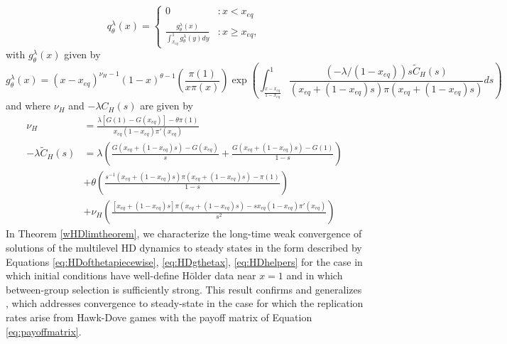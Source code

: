 \documentclass[11pt]{article}
\numberwithin{equation}{section}
\newcommand{\ds}{\displaystyle}
\begin{document}
{ \begin{equation} \label{eq:HDofthetapiecewise}
   q^{\lambda}_{\theta}(x) = \left\{
     \begin{array}{lr}
       0 & : x < x_{eq}\\
       \ds\frac{g^{\lambda}_{\theta}(x)}{\int_{x_{eq}}^{1} g^{\lambda}_{\theta}(y) dy}  & : x \geq x_{eq},
     \end{array}
   \right.
\end{equation} 
with  $g^{\lambda}_{\theta}(x)$ given by
\begin{equation} \label{eq:HDgthetax}
    g^{\lambda}_{\theta}(x) = \left(x - x_{eq}\right)^{\nu_H - 1} \left(1 - x\right)^{\theta - 1} \left( \frac{\pi(1)}{x \pi(x)} \right) \exp\left(\int_{\frac{x-x_{eq}}{1 - x_{eq}}}^1 \frac{\left(-\lambda / (1-x_{eq}) \right) s \tilde{C}_H(s) }{(x_{eq} + (1 - x_{eq}) s) \pi(x_{eq} + (1-x_{eq}) s)} ds \right)
\end{equation}
and where $\nu_H$ and $-\lambda C_H(s)$ are given by
\begin{subequations} \label{eq:HDhelpers}
\begin{align}
\nu_H &= \frac{\lambda \left[G(1) - G(x_{eq})\right] - \theta \pi(1)}{x_{eq}(1-x_{eq}) \pi'(x_{eq})} \\
    -\lambda \tilde{C}_H(s) &= \lambda \left(\frac{G\left(x_{eq} + (1-x_{eq}) s\right) - G(x_{eq})}{s} +  \frac{G\left(x_{eq} + (1-x_{eq}) s \right) - G(1)}{1-s}\right) \\ & + \theta \left(\frac{s^{-1} \left(x_{eq} + (1-x_{eq}) s  \right) \pi\left( x_{eq} + (1-x_{eq}) s \right) - \pi(1)}{1-s} \right) \nonumber \\%
    & + \nu_H \left(\frac{ \left[x_{eq} + (1-x_{eq}) s \right] \pi\left( x_{eq} + (1-x_{eq}) s \right) - s x_{eq} (1-x_{eq}) \pi'(x_{eq})}{s^2} \right)  \nonumber  
    \end{align}
\end{subequations}
% 
In Theorem \ref{wHDlimtheorem}, we characterize the long-time weak convergence of solutions of the multilevel HD dynamics to steady states in the form described by Equations \eqref{eq:HDofthetapiecewise}, \eqref{eq:HDgthetax}, \eqref{eq:HDhelpers} for the case in which initial conditions have well-define H{\"o}lder data near $x=1$ and in which between-group selection is sufficiently strong. This result confirms and generalizes \cite[Conjecture 2]{cooney2020analysis}, which addresses convergence to steady-state in the case for which the replication rates arise from Hawk-Dove games with the payoff matrix of Equation \eqref{eq:payoffmatrix}. 
}
\end{document}
